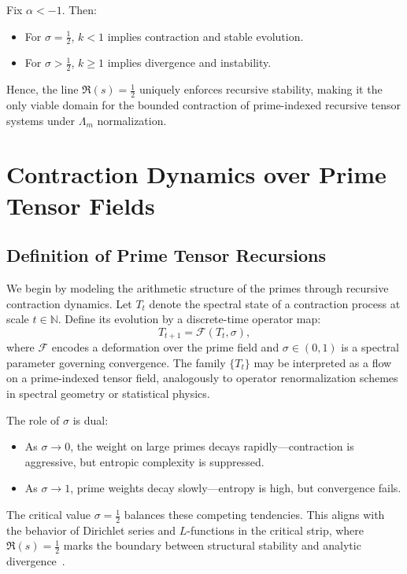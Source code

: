 \documentclass[12pt]{article}
\begin{document}
Fix $\alpha < -1$. Then:
\begin{itemize}
  \item For $\sigma = \frac{1}{2}$, $k < 1$ implies contraction and stable evolution.
  \item For $\sigma > \frac{1}{2}$, $k \geq 1$ implies divergence and instability.
\end{itemize}

Hence, the line $\Re(s) = \frac{1}{2}$ uniquely enforces recursive stability, making it the only viable domain for the bounded contraction of prime-indexed recursive tensor systems under $\Lambda_m$ normalization.


\section{Contraction Dynamics over Prime Tensor Fields}

\subsection{Definition of Prime Tensor Recursions}

We begin by modeling the arithmetic structure of the primes through recursive contraction dynamics. Let $T_t$ denote the spectral state of a contraction process at scale $t \in \mathbb{N}$. Define its evolution by a discrete-time operator map:
\[
T_{t+1} = \mathcal{F}(T_t, \sigma),
\]
where $\mathcal{F}$ encodes a deformation over the prime field and $\sigma \in (0,1)$ is a spectral parameter governing convergence. The family $\{T_t\}$ may be interpreted as a flow on a prime-indexed tensor field, analogously to operator renormalization schemes in spectral geometry or statistical physics.

The role of $\sigma$ is dual:
\begin{itemize}
    \item As $\sigma \to 0$, the weight on large primes decays rapidly—contraction is aggressive, but entropic complexity is suppressed.
    \item As $\sigma \to 1$, prime weights decay slowly—entropy is high, but convergence fails.
\end{itemize}

The critical value $\sigma = \tfrac{1}{2}$ balances these competing tendencies. This aligns with the behavior of Dirichlet series and $L$-functions in the critical strip, where $\Re(s) = \tfrac{1}{2}$ marks the boundary between structural stability and analytic divergence~\cite{titchmarsh1986zeta, montgomery1971topics}.
\end{document}
